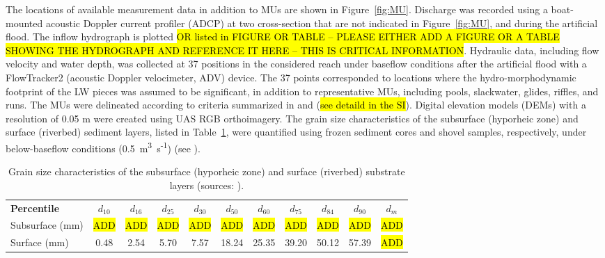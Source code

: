 \documentclass[draft,linenumbers,onecolumn]{agujournal2019} %
\begin{document}
The locations of available measurement data in addition to MUs are shown in Figure~\ref{fig:MU}. Discharge was recorded using a boat-mounted acoustic Doppler current profiler (ADCP) at two cross-section that are not indicated in Figure~\ref{fig:MU}, and during the artificial flood. The inflow hydrograph is plotted \hl{OR listed in FIGURE OR TABLE -- PLEASE EITHER ADD A FIGURE OR A TABLE SHOWING THE HYDROGRAPH AND REFERENCE IT HERE -- THIS IS CRITICAL INFORMATION}.
Hydraulic data, including flow velocity and water depth, was collected at 37 positions in the considered reach under baseflow conditions after the artificial flood with a FlowTracker2 (acoustic Doppler velocimeter, ADV) device.  The 37 points corresponded to locations where the hydro-morphodynamic footprint of the LW pieces was assumed to be significant, in addition to representative MUs, including pools, slackwater, glides, riffles, and runs. The MUs were delineated according to criteria summarized in  and  (\hl{see detaild in the SI}). Digital elevation models (DEMs) with a resolution of 0.05 m were created using UAS RGB orthoimagery. The grain size characteristics of the subsurface (hyporheic zone) and surface (riverbed) sediment layers, listed in Table~\ref{tab:grain-sizes}, were quantified using frozen sediment cores and shovel samples, respectively, under below-baseflow conditions (0.5~m\textsuperscript{3}~s\textsuperscript{-1}) (see ).

\begin{table}[h]
	\centering
	\caption{Grain size characteristics of the subsurface (hyporheic zone) and surface (riverbed) substrate layers (sources: ).}
	\begin{tabular}{lcccccccccc}
		\hline
		\textbf{Percentile} & $d_{10}$ & $d_{16}$ & $d_{25}$ & $d_{30}$ & $d_{50}$ & $d_{60}$ & $d_{75}$ & $d_{84}$ & $d_{90}$ & $d_m$\\
		Subsurface (mm)       &    \hl{ADD}   &  \hl{ADD}     &   \hl{ADD}    &    \hl{ADD}   &  \hl{ADD}   &   \hl{ADD}  &  \hl{ADD}   &  \hl{ADD}   &  \hl{ADD} & \hl{ADD}  \\
		Surface (mm)       & 0.48      & 2.54      & 5.70      & 7.57      & 18.24     & 25.35     & 39.20     & 50.12     & 57.39  & \hl{ADD}   \\
		\hline
	\end{tabular}
	\label{tab:grain-sizes}
\end{table}
\end{document}
